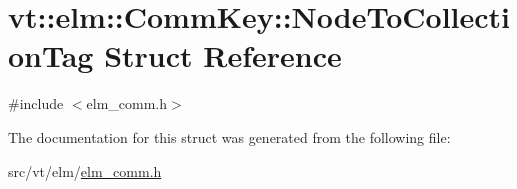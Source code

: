 \hypertarget{structvt_1_1elm_1_1_comm_key_1_1_node_to_collection_tag}{}\section{vt\+:\+:elm\+:\+:Comm\+Key\+:\+:Node\+To\+Collection\+Tag Struct Reference}
\label{structvt_1_1elm_1_1_comm_key_1_1_node_to_collection_tag}


{\ttfamily \#include $<$elm\+\_\+comm.\+h$>$}



The documentation for this struct was generated from the following file\+:\begin{DoxyCompactItemize}
\item 
src/vt/elm/\hyperlink{elm__comm_8h}{elm\+\_\+comm.\+h}\end{DoxyCompactItemize}
